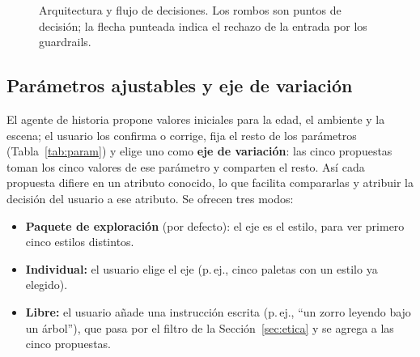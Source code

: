 \documentclass[10pt,a4paper,twocolumn]{article}
\begin{document}
\begin{figure}[!t]
\caption{Arquitectura y flujo de decisiones. Los rombos son puntos de decisión; la flecha punteada indica el rechazo de la entrada por los guardrails.}\label{fig:arq}
\end{figure}

\subsection{Parámetros ajustables y eje de variación}
El agente de historia propone valores iniciales para la edad, el ambiente y la escena; el usuario los confirma o corrige, fija el resto de los parámetros (Tabla~\ref{tab:param}) y elige uno como \textbf{eje de variación}: las cinco propuestas toman los cinco valores de ese parámetro y comparten el resto. Así cada propuesta difiere en un atributo conocido, lo que facilita compararlas y atribuir la decisión del usuario a ese atributo. Se ofrecen tres modos:
\begin{itemize}
\item \textbf{Paquete de exploración} (por defecto): el eje es el estilo, para ver primero cinco estilos distintos.
\item \textbf{Individual:} el usuario elige el eje (p.\,ej., cinco paletas con un estilo ya elegido).
\item \textbf{Libre:} el usuario añade una instrucción escrita (p.\,ej., ``un zorro leyendo bajo un árbol''), que pasa por el filtro de la Sección~\ref{sec:etica} y se agrega a las cinco propuestas.
\end{itemize}
\end{document}
